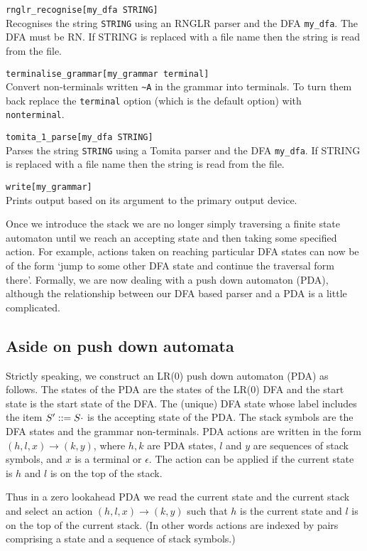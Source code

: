 {\verb+rnglr_recognise[my_dfa STRING]+\\
Recognises the string \verb+STRING+ using an RNGLR parser and the DFA
\verb+my_dfa+. The DFA must be RN. If STRING is replaced with a file
name then the string is read from the file.

\verb+terminalise_grammar[my_grammar terminal]+\\
Convert non-terminals written \verb+~A+ in the grammar into terminals.
To turn them back replace the \verb+terminal+ option (which is the
default option) with \verb+nonterminal+.

\verb+tomita_1_parse[my_dfa STRING]+\\
Parses the string \verb+STRING+ using a Tomita parser and the DFA
\verb+my_dfa+. If STRING is replaced with a file name then the string
is read from the file.

\verb+write[my_grammar]+ \\
Prints output based on its argument to the primary output device.
}




Once we introduce the stack we are no longer simply traversing a
finite state automaton until we reach an accepting state and then
taking some specified action. For example, actions taken on reaching 
particular DFA states can now be of the form `jump to some other DFA state
and continue the traversal form there'. Formally, we are now dealing
with a push down automaton (PDA), although the relationship between our DFA
based parser and a PDA is a little complicated.

\subsection{Aside on push down automata}\label{PDA}

Strictly speaking, we construct an LR(0) push down automaton (PDA)
as follows. The states of the PDA are the states of the LR(0) DFA and
the start state is the start state of the DFA.
The (unique) DFA state whose label includes the item
$S'::= S\cdot$ is the accepting state of the PDA.
The stack symbols are the DFA states and the grammar non-terminals. 
PDA actions are written in the form $(h,l,x)\to(k,y)$, where $h,k$
are PDA states, $l$ and $y$ are sequences of stack symbols,
and $x$ is a terminal or $\epsilon$. The action can be applied if the
current state is $h$ and $l$ is on the top of the stack.

Thus in a zero lookahead PDA we read the current state and the current
stack and select an action $(h,l,x)\to(k,y)$ such that $h$ is the
current state and $l$ is on the top of the current stack. (In other
words actions are indexed by pairs comprising a state and a sequence
of stack symbols.)

